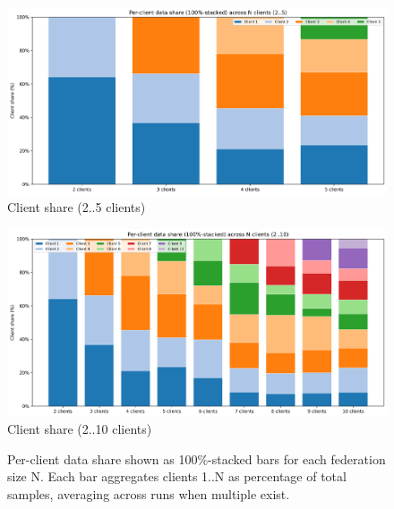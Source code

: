 \documentclass[conference]{IEEEtran}
\begin{document}
\begin{figure}[H]
    \centering
    \begin{minipage}[t]{0.48\textwidth}
        \centering
        \includegraphics[width=\linewidth]{../analysis_results/classification/federated/client_distributions/client_share_stacked_2_5.png}\\[-2pt]
        {\footnotesize Client share (2..5 clients)}
    \end{minipage}\hfill
    \begin{minipage}[t]{0.48\textwidth}
        \centering
        \includegraphics[width=\linewidth]{../analysis_results/classification/federated/client_distributions/client_share_stacked_2_10.png}\\[-2pt]
        {\footnotesize Client share (2..10 clients)}
    \end{minipage}
    \caption{Per-client data share shown as 100\%-stacked bars for each federation size N. Each bar aggregates clients 1..N as percentage of total samples, averaging across runs when multiple exist.}
    \label{fig:client_share_stacked}
\end{figure}
\end{document}

